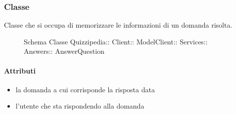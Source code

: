 \subsubsection{Classe }
Classe che si occupa di memorizzare le informazioni di un domanda risolta.
\begin{figure}[H]
\centering
\noindent{}
\caption[Schema Classe AnswerQuestion]{Schema Classe Quizzipedia:: Client:: ModelClient:: Services:: Answers:: AnswerQuestion}
\end{figure}
\paragraph{Attributi}
\begin{itemize}
\item {}
\newline
la domanda a cui corrisponde la risposta data
\item {}
\newline
l'utente che sta rispondendo alla domanda
\end{itemize}
